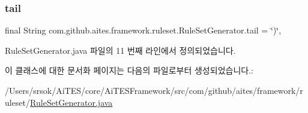 \mbox{\label{classcom_1_1github_1_1aites_1_1framework_1_1ruleset_1_1_rule_set_generator_a2bd41e50cccfad575989d06ea487100e}} 
\subsubsection{\texorpdfstring{tail}{tail}}
{\footnotesize\ttfamily final String com.\+github.\+aites.\+framework.\+ruleset.\+Rule\+Set\+Generator.\+tail = \char`\"{})\char`\"{}\hspace{0.3cm}{\ttfamily [static]}, {\ttfamily [private]}}



Rule\+Set\+Generator.\+java 파일의 11 번째 라인에서 정의되었습니다.



이 클래스에 대한 문서화 페이지는 다음의 파일로부터 생성되었습니다.\+:\begin{DoxyCompactItemize}
\item 
/\+Users/srsok/\+Ai\+T\+E\+S/core/\+Ai\+T\+E\+S\+Framework/src/com/github/aites/framework/ruleset/\mbox{\hyperlink{_rule_set_generator_8java}{Rule\+Set\+Generator.\+java}}\end{DoxyCompactItemize}
